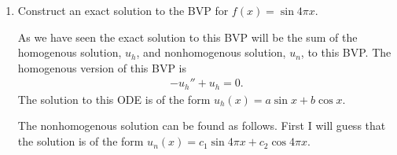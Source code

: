 \documentclass[11pt, oneside]{article}
\begin{document}
\begin{enumerate}
        This is equivalent to the following matrix equation
        \begin{align*}
            A\v{u} &= \v{f}
            \intertext{where}
            \v{u} &= \br{U_0, U_1, \cdots, U_N}^T \\
            \v{f} &= \br{f(x_0), f(x_1), \cdots, f(x_N)}^T \\
            A &= \frac{1}{12h^2}
            \begin{bmatrix}
                30     & -16    & 1      &        & \cdots & 1      & -16 \\
                -16    & 30     & -16    & 1      &        & \cdots & 1   \\
                1      & -16    & 30     & -16    & 1      &        &     \\
                \vdots & \ddots & \ddots & \ddots & \ddots & \ddots & \vdots \\
                       &        & 1      & -16    & 30     & -16    & 1   \\
                1      & \cdots &        & 1      & -16    & 30     & -16 \\
                -16    & 1      & \cdots &        & 1      & -16     & 30 \\
            \end{bmatrix}
        \end{align*}

    \item %
        Construct an exact solution to the BVP for $f(x) = \sin{4\pi x}$.

        As we have seen the exact solution to this BVP will be the sum of the
        homogenous solution, $u_h$, and nonhomogenous solution, $u_n$, to this BVP.
        The homogenous version of this BVP is
        \begin{align*}
            -u_h'' + u_h = 0.
        \end{align*}
        The solution to this ODE is of the form $u_h(x) = a\sin{x} + b\cos{x}$.

        The nonhomogenous solution can be found as follows.
        First I will guess that the solution is of the form
        $u_n(x) = c_1 \sin{4\pi x} + c_2\cos{4 \pi x}$.


\end{enumerate}
\end{document}
